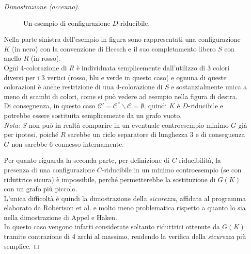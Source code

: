 \documentclass[a4paper,12pt,titlepage]{report}
\begin{document}
\begin{proof}[Dimostrazione (accenno)]
\begin{figure}[H]
{
    	}
    	\vspace{0.5cm}
    	\caption{Un esempio di configurazione $\mathit{D}$-riducibile.}
    	\end{figure} 
    	\noindent Nella parte sinistra dell'esempio in figura sono rappresentati una configurazione $K$ (in nero) con la convenzione di Heesch e il suo completamento libero $S$ con anello $R$ (in rosso).
    	\\Ogni 4-colorazione di $R$ è individuata semplicemente dall'utilizzo di 3 colori diversi per i 3 vertici (rosso, blu e verde in questo caso) e ognuna di queste colorazioni è anche restrizione di una 4-colorazione di $S$ e sostanzialmente unica a meno di scambi di colori, come si può vedere ad esempio nella figura di destra.
    	\\Di conseguenza, in questo caso $\mathcal{C}' = \mathcal{C}^* \smallsetminus \mathcal{C} = \emptyset$, quindi $K$ è $\mathit{D}$-riducibile e potrebbe essere sostituita semplicemente da un grafo vuoto.
    	\\\emph{Nota:} $S$ non può in realtà comparire in un eventuale controesempio minimo $G$ già per ipotesi, poiché $R$ sarebbe un ciclo separatore di lunghezza 3 e di conseguenza $G$ non sarebbe 6-connesso internamente.
    	\vspace{0.5cm}
    	
    	Per quanto riguarda la seconda parte, per definizione di $\mathit{C}$-riducibilità, la presenza di una configurazione $\mathit{C}$-riducibile in un minimo controesempio (se con riduttrice sicura) è impossibile, perché permetterebbe la sostituzione di $G(K)$ con un grafo più piccolo.
    	\\L'unica difficoltà è quindi la dimostrazione della \emph{sicurezza}, affidata al programma elaborato da Robertson et al. e molto meno problematica rispetto a quanto lo sia nella dimostrazione di Appel e Haken.
    	\\In questo caso vengono infatti considerate soltanto riduttrici ottenute da $G(K)$ tramite contrazione di 4 archi al massimo, rendendo la verifica della \emph{sicurezza} più semplice.
    	

\end{proof}
\end{document}
